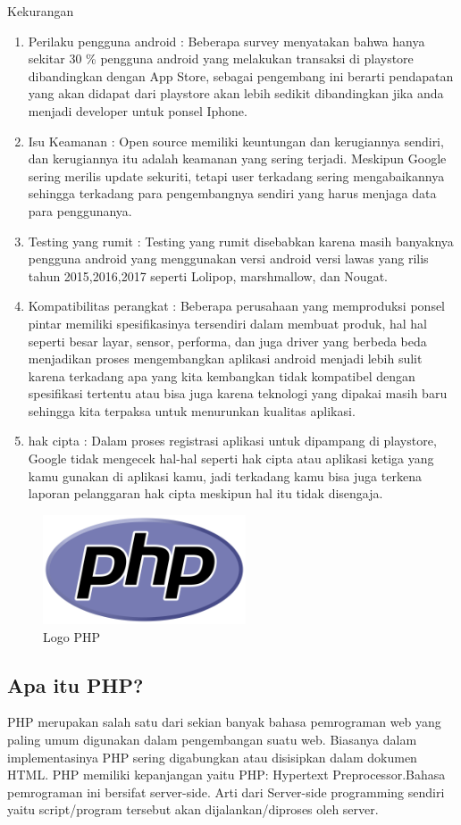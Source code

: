 Kekurangan
\begin{enumerate}
	\item Perilaku pengguna android : Beberapa survey menyatakan bahwa hanya sekitar 30 \% pengguna android yang melakukan transaksi di playstore dibandingkan dengan App Store, sebagai pengembang ini berarti pendapatan yang akan didapat dari playstore akan lebih sedikit dibandingkan jika anda menjadi developer untuk ponsel Iphone.
	\item Isu Keamanan : Open source memiliki keuntungan dan kerugiannya sendiri, dan kerugiannya itu adalah keamanan yang sering terjadi. Meskipun Google sering merilis update sekuriti, tetapi user terkadang sering mengabaikannya sehingga terkadang para pengembangnya sendiri yang harus menjaga data para penggunanya.
	\item Testing yang rumit : Testing yang rumit disebabkan karena masih banyaknya pengguna android yang menggunakan versi android versi lawas yang rilis tahun 2015,2016,2017 seperti Lolipop, marshmallow, dan Nougat.
	\item Kompatibilitas perangkat : Beberapa perusahaan yang memproduksi ponsel pintar memiliki spesifikasinya tersendiri dalam membuat produk, hal hal seperti besar layar, sensor, performa, dan juga driver yang berbeda beda menjadikan proses mengembangkan aplikasi android menjadi lebih sulit karena terkadang apa yang kita kembangkan tidak kompatibel dengan spesifikasi tertentu atau bisa juga karena teknologi yang dipakai masih baru sehingga kita terpaksa untuk menurunkan kualitas aplikasi.
	\item hak cipta : Dalam proses registrasi aplikasi untuk dipampang di playstore,  Google tidak mengecek hal-hal seperti hak cipta atau aplikasi ketiga yang kamu gunakan di aplikasi kamu, jadi terkadang kamu bisa juga terkena laporan pelanggaran hak cipta meskipun hal itu tidak disengaja.
\end{enumerate}
	\begin{figure}[H]
		\includegraphics[width=6cm]{figures/web/php.png}
		\centering
		\caption{Logo PHP}
	\end{figure}
\subsection{Apa itu PHP?}
PHP merupakan salah satu dari sekian banyak bahasa pemrograman web yang paling umum digunakan dalam pengembangan suatu web. Biasanya dalam implementasinya PHP sering digabungkan atau disisipkan dalam dokumen HTML. PHP memiliki kepanjangan yaitu PHP: Hypertext Preprocessor.Bahasa pemrograman ini bersifat server-side. Arti dari Server-side programming sendiri yaitu script/program tersebut akan dijalankan/diproses oleh server. 

